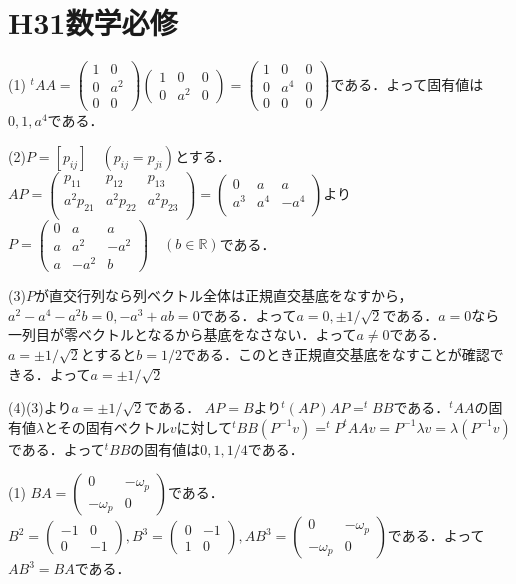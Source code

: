 \documentclass[
		book,
		head_space=20mm,
		foot_space=20mm,
		gutter=10mm,
		line_length=190mm
]{jlreq}
\begin{document}
\section{H31数学必修}
(1) $^tAA=\begin{pmatrix}
	1 & 0\\
	0 & a^2 \\
	0 & 0
\end{pmatrix}\begin{pmatrix}
	1 & 0 & 0\\
	0 & a^2 & 0
\end{pmatrix}=\begin{pmatrix}
	1 & 0 & 0\\
	0 & a^4 & 0\\
	0 & 0 & 0
\end{pmatrix}$である．よって固有値は$0,1,a^4$である．

(2)$P=[p_{ij}]\quad(p_{ij}=p_{ji})$とする．$AP=\begin{pmatrix}
	p_{11} & p_{12} & p_{13}\\
	a^2p_{21} & a^2p_{22} & a^2p_{23}\\
\end{pmatrix}=\begin{pmatrix}
	0 & a & a \\
	a^3 & a^4 & -a^4\\
\end{pmatrix}$より$P=\begin{pmatrix}
	0 & a & a\\
	a & a^2 & -a^2\\
	a & -a^2 & b 
\end{pmatrix}\quad(b \in \mathbb{R})$である．

(3)$P$が直交行列なら列ベクトル全体は正規直交基底をなすから，$a^2-a^4-a^2b=0,-a^3+ab=0$である．よって$a=0,\pm{1/\sqrt{2}}$である．$a=0$なら一列目が零ベクトルとなるから基底をなさない．よって$a\neq 0$である．$a=\pm{1}/\sqrt{2}$とすると$b=1/2$である．このとき正規直交基底をなすことが確認できる．よって$a=\pm{1}/\sqrt{2}$

(4)(3)より$a=\pm{1}/\sqrt{2}$である．
$AP=B$より$^t(AP)AP=^tBB$である．$^tAA$の固有値$\lambda$とその固有ベクトル$v$に対して$^tBB(P^{-1}v)=^tP^tAAv=P^{-1}\lambda v=\lambda(P^{-1}v)$である．よって$^tBB$の固有値は$0,1,1/4$である．

(1)
$BA=\begin{pmatrix}
	0 & -\omega_p \\
	-\omega_p & 0
	\end{pmatrix}$である．$B^2=\begin{pmatrix}
		-1 & 0\\
		0 & -1
		\end{pmatrix},B^3=\begin{pmatrix}
			0 & -1 \\
			1 & 0
			\end{pmatrix},AB^3=\begin{pmatrix}
				0 & -\omega_p\\
				-\omega_p & 0
			\end{pmatrix}$である．よって$AB^3=BA$である．
\end{document}
